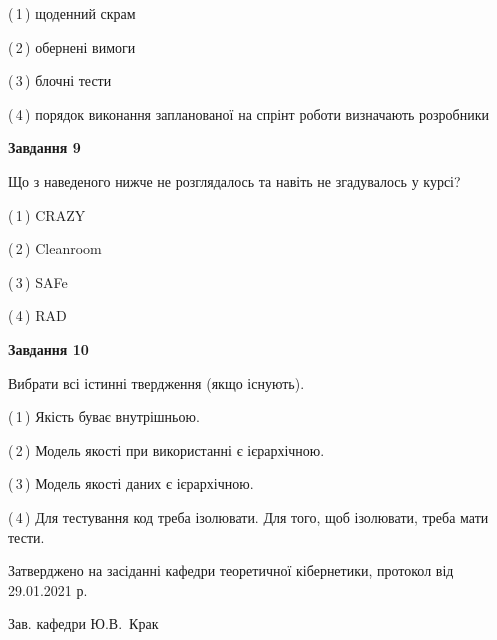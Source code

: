 \documentclass[10pt, ukrainian]{article}
\begin{document}
{\begin {large}
(\,1\,) щоденний скрам%



(\,2\,) обернені вимоги%



(\,3\,) блочні тести%



(\,4\,) порядок виконання запланованої на спрінт роботи визначають розробники%


{\begin {center}\textbf{Завдання 9}\end {center}}\par
Що з наведеного нижче не розглядалось та навіть не згадувалось у курсі?\par
\vspace{2mm}



(\,1\,) CRAZY%



(\,2\,) Cleanroom%



(\,3\,) SAFe%



(\,4\,) RAD%


{\begin {center}\textbf{Завдання 10}\end {center}}\par
Вибрати всі істинні твердження (якщо існують).\par
\vspace{2mm}



(\,1\,) Якість буває внутрішньою.%



(\,2\,) Модель якості при використанні є ієрархічною.%



(\,3\,) Модель якості даних є ієрархічною.%



(\,4\,) Для тестування код треба ізолювати. Для того, щоб ізолювати, треба мати тести.%



\end {large}}
{\vspace{5mm}\smallskip \begin {small} Затверджено на засіданні кафедри теоретичної кібернетики, протокол  від   29.01.2021 р.\par\smallskip\smallskip
{\parbox {6.5 cm}{Зав. кафедри \dotfill Ю.В.~Крак}} \end{small}}
\newpage
\end{document}
